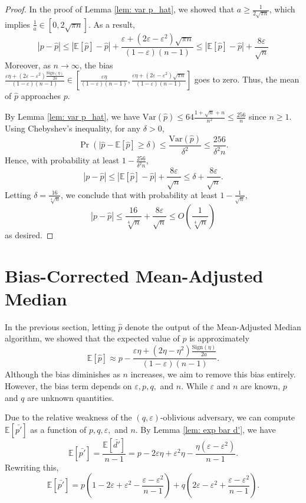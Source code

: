 \documentclass[10pt,onecolumn,letterpaper]{article}
\newcommand{\ee}{\mathbb{E}}
\newcommand{\Var}{\mathrm{Var}}
\newcommand{\eps}{\varepsilon}
\let\epsilon\varepsilon
\begin{document}
\begin{proof}
In the proof of Lemma \ref{lem: var p_hat}, we showed that $a \geq \frac{1}{2\sqrt{\pi n}}$, which implies $\frac{1}{a}\in[0, 2\sqrt{\pi n}]$. As a result, $$|p-\hat p| \leq |\ee[\hat p] -\hat p| + \frac{\eps + (2\eps-\eps^2)\sqrt{\pi n}}{(1-\eps)(n-1)} \leq |\ee[\hat p] -\hat p| + \frac{8\eps}{\sqrt n}$$ Moreover, as $n\to\infty$, the bias $\frac{\epsilon\eta + (2\eps - \eps^2)\frac{\mathrm{Sign}(\eta)}{2a}}{(1-\eps)(n-1)} \in \left[\frac{\eps\eta}{(1-\eps)(n-1)}, \frac{\eps\eta + (2\eps - \eps^2)\sqrt{\pi n}}{(1-\eps)(n-1)}\right]$ goes to zero. Thus, the mean of $\hat p$ approaches $p$.

By Lemma \ref{lem: var p_hat}, we have $\Var(\hat p) \leq 64\frac{1 + \sqrt{n} + n}{n^2} \leq \frac{256}{n}$ since $n\geq 1$. Using Chebyshev's inequality, for any $\delta > 0$, $$\Pr(|\hat p-\ee[\hat p]\geq \delta)\leq \frac{\Var(\hat p)}{\delta^2} \leq \frac{256}{\delta^2n}.$$ Hence, with probability at least $1 - \frac{256}{\delta^2 n}$, $$|p-\hat p| \leq |\ee[\hat p]-\hat p| + \frac{8\eps}{\sqrt{n}} \leq \delta + \frac{8\eps}{\sqrt{n}}.$$ Letting $\delta = \frac{16}{\sqrt[4]{n}}$, we conclude that with probability at least $1-\frac{1}{\sqrt{n}}$, $$|p -\hat p| \leq \frac{16}{\sqrt[4]{n}} + \frac{8\eps}{\sqrt{n}}\leq O\left(\frac{1}{\sqrt[4]{n}}\right)$$ as desired.


\end{proof}



\section{Bias-Corrected Mean-Adjusted Median}

In the previous section, letting $\hat{p}$ denote the output of the Mean-Adjusted Median algorithm, we showed that the expected value of $\hat{p}$ is approximately $$\mathbb{E}[\hat{p}] \approx p - \frac{\eps\eta + (2\eta - \eta^2)\frac{\mathrm{Sign}(\eta)}{2a}}{(1-\eps)(n-1)}.$$ Although the bias diminishes as $n$ increases, we aim to remove this bias entirely. However, the bias term depends on $\eps, p, q,$ and $n$. While $\eps$ and $n$ are known, $p$ and $q$ are unknown quantities.

Due to the relative weakness of the $(q, \eps)$-oblivious adversary, we can compute $\mathbb{E}[\bar{p'}]$ as a function of $p, q, \eps,$ and $n$. By Lemma \ref{lem: exp bar d'}, we have $$\mathbb{E}[\bar{p'}] = \frac{\mathbb{E}[\bar{d'}]}{n-1} = p - 2\eps\eta + \eps^2\eta - \frac{\eta(\eps-\eps^2)}{n-1}.$$ Rewriting this, $$\mathbb{E}[\bar{p'}] = p\left(1 - 2\eps + \eps^2 - \frac{\eps-\eps^2}{n-1}\right) + q\left(2\eps - \eps^2 + \frac{\eps-\eps^2}{n-1}\right).$$
\end{document}

